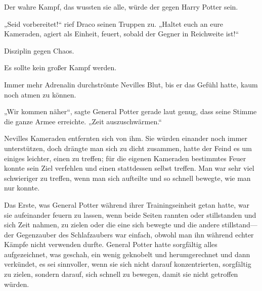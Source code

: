 Der wahre Kampf, das wussten sie alle, würde der gegen Harry Potter sein.

„Seid vorbereitet!“ rief Draco seinen Truppen zu.
„Haltet euch an eure Kameraden, agiert als Einheit, feuert, sobald der Gegner in Reichweite ist!“

Disziplin gegen Chaos.

Es sollte kein großer Kampf werden.

\later

Immer mehr Adrenalin durchströmte Nevilles Blut, bis er das Gefühl hatte, kaum noch atmen zu können.

„Wir kommen näher“, sagte General Potter gerade laut genug, dass seine Stimme die ganze Armee erreichte.
„Zeit auszuschwärmen.“

Nevilles Kameraden entfernten sich von ihm. Sie würden einander noch immer unterstützen, doch drängte man sich zu dicht zusammen, hatte der Feind es um einiges leichter, einen zu treffen; für die eigenen Kameraden bestimmtes Feuer konnte sein Ziel verfehlen und einen stattdessen selbst treffen. Man war sehr viel schwieriger zu treffen, wenn man sich aufteilte und so schnell bewegte, wie man nur konnte.

Das Erste, was General Potter während ihrer Trainingseinheit getan hatte, war sie aufeinander feuern zu lassen, wenn beide Seiten rannten oder stillstanden und sich Zeit nahmen, zu zielen oder die eine sich bewegte und die andere stillstand—der Gegenzauber des Schlafzaubers war einfach, obwohl man ihn während echter Kämpfe nicht verwenden durfte. General Potter hatte sorgfältig alles aufgezeichnet, was geschah, ein wenig geknobelt und herumgerechnet und dann verkündet, es sei sinnvoller, wenn sie sich nicht darauf konzentrierten, sorgfältig zu zielen, sondern darauf, sich schnell zu bewegen, damit sie nicht getroffen würden.

